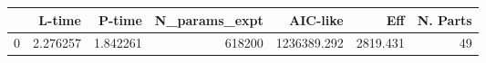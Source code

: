 \begin{tabular}{lrrrrrr}
\toprule
{} &    L-time &    P-time &  N\_params\_expt &     AIC-like &       Eff &  N. Parts \\
\midrule
0 &  2.276257 &  1.842261 &         618200 &  1236389.292 &  2819.431 &        49 \\
\bottomrule
\end{tabular}
